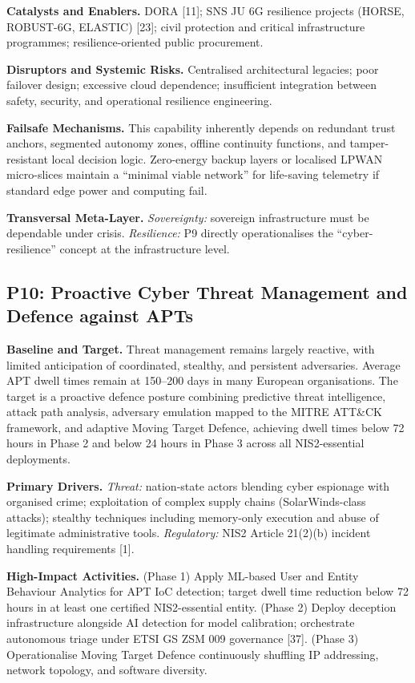 \documentclass{ieeeaccess}
\begin{document}
\textbf{Catalysts and Enablers.} DORA {[}11{]}; SNS JU 6G resilience
projects (HORSE, ROBUST-6G, ELASTIC) {[}23{]}; civil protection and
critical infrastructure programmes; resilience-oriented public
procurement.

\textbf{Disruptors and Systemic Risks.} Centralised architectural
legacies; poor failover design; excessive cloud dependence; insufficient
integration between safety, security, and operational resilience
engineering.

\textbf{Failsafe Mechanisms.} This capability inherently depends on
redundant trust anchors, segmented autonomy zones, offline continuity
functions, and tamper-resistant local decision logic. Zero-energy backup
layers or localised LPWAN micro-slices maintain a ``minimal viable
network'' for life-saving telemetry if standard edge power and computing
fail.

\textbf{Transversal Meta-Layer.} \emph{Sovereignty:} sovereign
infrastructure must be dependable under crisis. \emph{Resilience:} P9
directly operationalises the ``cyber-resilience'' concept at the
infrastructure level.

\subsection{P10: Proactive Cyber Threat Management and Defence
against
APTs}\label{p10-proactive-cyber-threat-management-and-defence-against-apts}

\textbf{Baseline and Target.} Threat management remains largely
reactive, with limited anticipation of coordinated, stealthy, and
persistent adversaries. Average APT dwell times remain at 150--200 days
in many European organisations. The target is a proactive defence
posture combining predictive threat intelligence, attack path analysis,
adversary emulation mapped to the MITRE ATT\&CK framework, and adaptive
Moving Target Defence, achieving dwell times below 72 hours in Phase 2
and below 24 hours in Phase 3 across all NIS2-essential deployments.

\textbf{Primary Drivers.} \emph{Threat:} nation-state actors blending
cyber espionage with organised crime; exploitation of complex supply
chains (SolarWinds-class attacks); stealthy techniques including
memory-only execution and abuse of legitimate administrative tools.
\emph{Regulatory:} NIS2 Article 21(2)(b) incident handling requirements
{[}1{]}.

\textbf{High-Impact Activities.} (Phase 1) Apply ML-based User and
Entity Behaviour Analytics for APT IoC detection; target dwell time
reduction below 72 hours in at least one certified NIS2-essential
entity. (Phase 2) Deploy deception infrastructure alongside AI detection
for model calibration; orchestrate autonomous triage under ETSI GS ZSM
009 governance {[}37{]}. (Phase 3) Operationalise Moving Target Defence
continuously shuffling IP addressing, network topology, and software
diversity.
\end{document}
